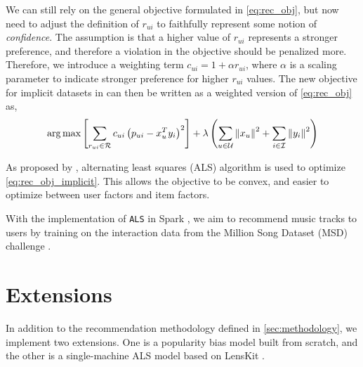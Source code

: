\documentclass{article}
\begin{document}
We can still rely on the general objective formulated in \cref{eq:rec_obj},
but now need to adjust the definition of $r_{ui}$ to faithfully represent 
some notion of \emph{confidence}. The assumption is that a higher value of 
$r_{ui}$ represents a stronger preference, and therefore a violation in the 
objective should be penalized more. Therefore, we introduce a weighting 
term $c_{ui} = 1 + \alpha r_{ui}$, where $\alpha$ is a scaling parameter to indicate stronger preference for 
higher $r_{ui}$ values. The new objective for implicit datasets in can then 
be written as a weighted version of \cref{eq:rec_obj} as,
\begin{align}
\operatorname*{\arg\max} \left[ \sum_{r_{ui} \in \mathcal{R}} c_{ui}\left( p_{ui} - x_u^T y_i \right)^2 \right] + \lambda \left( \sum_{u \in \mathcal{U}} \left\lVert x_u\right\rVert^2 + \sum_{i \in \mathcal{I}} \left\lVert y_i\right\rVert^2 \right) \label{eq:rec_obj_implicit}	
\end{align}

As proposed by \citep{koren2009}, alternating least squares (ALS) algorithm 
is used to optimize \cref{eq:rec_obj_implicit}. This allows the objective 
to be convex, and easier to optimize between user factors and item factors.

With the implementation of \texttt{ALS} in Spark 
\citep{spark2010,sparksql2015}, we aim to recommend music tracks to users 
by training on the interaction data from the Million Song Dataset (MSD)
challenge \citep{McFee2012TheMS}.

\section{Extensions}\label{sec:extensions}

In addition to the recommendation methodology defined in 
\cref{sec:methodology}, we implement two extensions. One is a popularity bias model built from scratch, and the other is a single-machine ALS model based on LensKit \citep{Ekstrand2020LensKitFP}.
\end{document}
